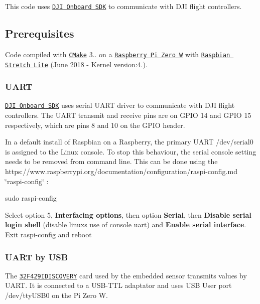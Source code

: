 This code uses \href{https://github.com/dji-sdk/Onboard-SDK/}{\tt D\+JI Onboard S\+DK} to communicate with D\+JI flight controllers.

\subsection*{Prerequisites}

Code compiled with \href{https://cmake.org/}{\tt C\+Make} 3.. on a \href{https://www.raspberrypi.org/products/raspberry-pi-zero-w/}{\tt Raspberry Pi Zero W} with \href{https://www.raspberrypi.org/downloads/raspbian/}{\tt Raspbian Stretch Lite} (June 2018 -\/ Kernel version\+:4.).

\subsubsection*{U\+A\+RT}

\href{https://github.com/dji-sdk/Onboard-SDK/}{\tt D\+JI Onboard S\+DK} uses serial U\+A\+RT driver to communicate with D\+JI flight controllers. The U\+A\+RT transmit and receive pins are on G\+P\+IO 14 and G\+P\+IO 15 respectively, which are pins 8 and 10 on the G\+P\+IO header.

In a default install of Raspbian on a Raspberry, the primary U\+A\+RT {\ttfamily /dev/serial0} is assigned to the Linux console. To stop this behaviour, the serial console setting needs to be removed from command line. This can be done using the https\+://www.raspberrypi.\+org/documentation/configuration/raspi-\/config.md \char`\"{}raspi-\/config\char`\"{} \+:


\begin{DoxyCode}
sudo raspi-config
\end{DoxyCode}
 Select option 5, {\bfseries Interfacing options}, then option {\bfseries Serial}, then {\bfseries Disable serial login shell} (disable linux\textquotesingle{}s use of console uart) and {\bfseries Enable serial interface}. Exit raspi-\/config and reboot

\subsubsection*{U\+A\+RT by U\+SB}

The \href{https://www.st.com/en/evaluation-tools/32f429idiscovery.html}{\tt 32\+F429\+I\+D\+I\+S\+C\+O\+V\+E\+RY} card used by the embedded sensor transmits values by U\+A\+RT. It is connected to a U\+S\+B-\/\+T\+TL adaptator and uses U\+SB User port {\ttfamily /dev/tty\+U\+S\+B0} on the Pi Zero W.

